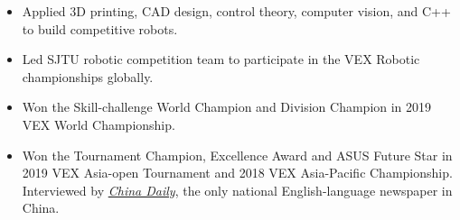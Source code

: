 \documentclass[10pt,a4paper]{article}
\begin{document}
\begin{itemize}[noitemsep,topsep=0pt]
    \item Applied 3D printing, CAD design, control theory, computer vision, and C++ to build competitive robots.
    \item Led SJTU robotic competition team to participate in the VEX Robotic championships globally. 
    \item Won the Skill-challenge World Champion and Division Champion in 2019 VEX World Championship.
    \item Won the Tournament Champion, Excellence Award and ASUS Future Star in 2019 VEX Asia-open Tournament and 2018 VEX Asia-Pacific Championship. Interviewed by \href{https://www.chinadaily.com.cn/a/201902/25/WS5c73ea69a3106c65c34eb502.html}{\emph{China Daily}}, the only national English-language newspaper in China.
\end{itemize}
\end{document}
